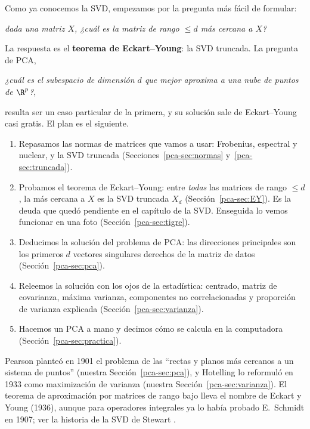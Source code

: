 Como ya conocemos la SVD, empezamos por la pregunta más fácil de formular:
\begin{center}
\emph{dada una matriz $X$, ¿cuál es la matriz de rango $\le d$ más cercana a $X$?}
\end{center}
La respuesta es el \textbf{teorema de Eckart--Young}: la SVD truncada. La
pregunta de PCA,
\begin{center}
\emph{¿cuál es el subespacio de dimensión $d$ que mejor aproxima a una nube de
puntos de $\R^p$?},
\end{center}
resulta ser un caso particular de la primera, y su solución sale de
Eckart--Young casi gratis. El plan es el siguiente.
\begin{enumerate}[leftmargin=*,itemsep=1pt]
\item Repasamos las normas de matrices que vamos a usar: Frobenius,
espectral y nuclear, y la SVD truncada
(Secciones~\ref{pca-sec:normas} y~\ref{pca-sec:truncada}).
\item Probamos el teorema de Eckart--Young: entre \emph{todas} las matrices de
rango $\le d$, la más cercana a $X$ es la SVD truncada $X_d$
(Sección~\ref{pca-sec:EY}). Es la deuda que quedó pendiente en el capítulo de
la SVD. Enseguida lo vemos funcionar en una foto (Sección~\ref{pca-sec:tigre}).
\item Deducimos la solución del problema de PCA: las direcciones principales
son los primeros $d$ vectores singulares derechos de la matriz de datos
(Sección~\ref{pca-sec:pca}).
\item Releemos la solución con los ojos de la estadística: centrado, matriz de
covarianza, máxima varianza, componentes no correlacionadas y proporción de
varianza explicada (Sección~\ref{pca-sec:varianza}).
\item Hacemos un PCA a mano y decimos cómo se calcula en la computadora
(Sección~\ref{pca-sec:practica}).
\end{enumerate}

\begin{remark}
Pearson \cite{Pearson1901} planteó en 1901 el problema de las ``rectas y planos
más cercanos a un sistema de puntos''  (nuestra Sección~\ref{pca-sec:pca}),
y Hotelling \cite{Hotelling1933} lo reformuló en 1933 como maximización de
varianza (nuestra Sección~\ref{pca-sec:varianza}). El teorema de
aproximación por matrices de rango bajo lleva el nombre de Eckart y Young
\cite{EckartYoung1936} (1936), aunque para operadores integrales ya lo había
probado E.~Schmidt en 1907; ver la historia de la SVD de Stewart
\cite{Stewart1993}.
\end{remark}

